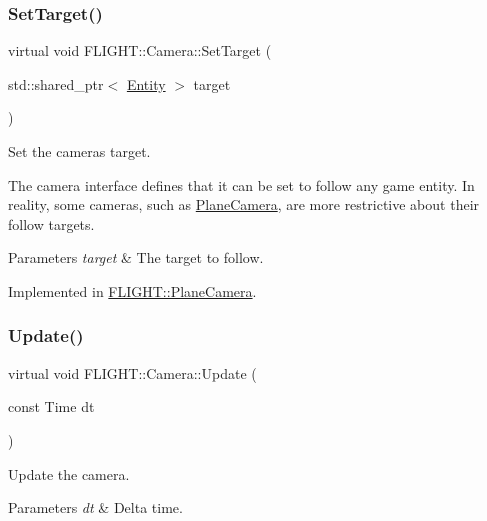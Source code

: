 \subsubsection{\texorpdfstring{Set\+Target()}{SetTarget()}}
{\footnotesize\ttfamily virtual void F\+L\+I\+G\+H\+T\+::\+Camera\+::\+Set\+Target (\begin{DoxyParamCaption}\item[{std\+::shared\+\_\+ptr$<$ \hyperlink{class_f_l_i_g_h_t_1_1_entity}{Entity} $>$}]{target }\end{DoxyParamCaption})\hspace{0.3cm}{\ttfamily [pure virtual]}}



Set the camera\textquotesingle{}s target. 

The camera interface defines that it can be set to follow any game entity. In reality, some cameras, such as \hyperlink{class_f_l_i_g_h_t_1_1_plane_camera}{Plane\+Camera}, are more restrictive about their follow targets. 
\begin{DoxyParams}{Parameters}
{\em target} & The target to follow. \\
\hline
\end{DoxyParams}


Implemented in \hyperlink{class_f_l_i_g_h_t_1_1_plane_camera_a2015a019a4008c3e7f8080df34d115b3}{F\+L\+I\+G\+H\+T\+::\+Plane\+Camera}.

\mbox{\label{class_f_l_i_g_h_t_1_1_camera_ad634b11d30c62bacf29d7d7bf13d3f0c}} 
\subsubsection{\texorpdfstring{Update()}{Update()}}
{\footnotesize\ttfamily virtual void F\+L\+I\+G\+H\+T\+::\+Camera\+::\+Update (\begin{DoxyParamCaption}\item[{const Time}]{dt }\end{DoxyParamCaption})\hspace{0.3cm}{\ttfamily [pure virtual]}}



Update the camera. 


\begin{DoxyParams}{Parameters}
{\em dt} & Delta time. \\
\hline
\end{DoxyParams}


